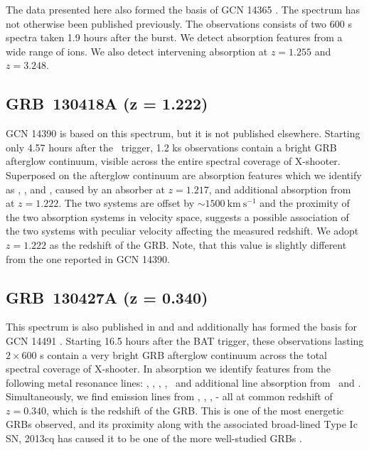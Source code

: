 \documentclass[longauth]{aa}    %
\begin{document}
The data presented here also formed the basis of GCN 14365 \citep{GCN14365}. The
spectrum has not otherwise been published previously. The observations consists
of two 600 s spectra taken 1.9 hours after the burst. We detect absorption
features from a wide range of ions. We also detect intervening absorption at
$z=1.255$ and $z=3.248$.

\subsection{GRB~130418A (z = 1.222)} \label{130418}

GCN 14390 \citep{GCN14390} is based on this spectrum, but it is not published
elsewhere. Starting only 4.57 hours after the \swift~trigger, 1.2 ks observations
contain a bright GRB afterglow continuum, visible across the entire spectral
coverage of X-shooter. Superposed on the afterglow continuum are absorption
features which we identify as \civ, \feii, and \mgii, caused by an absorber at
$z = 1.217$, and additional absorption from \civ~ at $z = 1.222$. The two
systems are offset by $\sim 1500~\mathrm{km}~\mathrm{s}^{-1}$ and the proximity
of the two absorption systems in velocity space, suggests a possible association
of the two systems with peculiar velocity affecting the measured redshift. We
adopt $z = 1.222$ as the redshift of the GRB. Note, that this value is slightly
different from the one reported in GCN 14390.

\subsection{GRB~130427A (z = 0.340)} \label{130427A}

This spectrum is also published in \citet{Xu2013b} and \citet{Kruhler2015} and
additionally has formed the basis for GCN 14491 \citep{GCN14491}. Starting 16.5
hours after the BAT trigger, these observations lasting $2 \times 600$ s contain
a very bright GRB afterglow continuum across the total spectral coverage of
X-shooter. In absorption we identify features from the following metal resonance
lines: \feii, \mnii, \mgii, \mgi, \TIii~and additional line absorption from
\caii~and \nai. Simultaneously, we find emission lines from \ha, \hb, \oiii,
\oii - all at common redshift of $z = 0.340$, which is the redshift of the GRB.
This is one of the most energetic GRBs observed, and its proximity along with
the associated broad-lined Type Ic SN, 2013cq has caused it to be one of the
more well-studied GRBs \citep{Maselli2014, Perley2014, Ackermann2014}.
\end{document}
